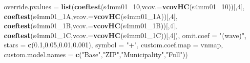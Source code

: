 \documentclass[
]{article}
\newenvironment{Shaded}{\begin{snugshade}}{\end{snugshade}}
\newcommand{\DataTypeTok}[1]{\textcolor[rgb]{0.13,0.29,0.53}{#1}}
\newcommand{\DecValTok}[1]{\textcolor[rgb]{0.00,0.00,0.81}{#1}}
\newcommand{\FloatTok}[1]{\textcolor[rgb]{0.00,0.00,0.81}{#1}}
\newcommand{\KeywordTok}[1]{\textcolor[rgb]{0.13,0.29,0.53}{\textbf{#1}}}
\newcommand{\NormalTok}[1]{#1}
\newcommand{\StringTok}[1]{\textcolor[rgb]{0.31,0.60,0.02}{#1}}
\begin{document}
\begin{Shaded}
\begin{Highlighting}[]
          \DataTypeTok{override.pvalues =} \KeywordTok{list}\NormalTok{(}\KeywordTok{coeftest}\NormalTok{(s4mm01_}\DecValTok{10}\NormalTok{,}\DataTypeTok{vcov.=}\KeywordTok{vcovHC}\NormalTok{(s4mm01_}\DecValTok{10}\NormalTok{))[,}\DecValTok{4}\NormalTok{],}
                                  \KeywordTok{coeftest}\NormalTok{(s4mm01_1A,}\DataTypeTok{vcov.=}\KeywordTok{vcovHC}\NormalTok{(s4mm01_1A))[,}\DecValTok{4}\NormalTok{],}
                                  \KeywordTok{coeftest}\NormalTok{(s4mm01_1B,}\DataTypeTok{vcov.=}\KeywordTok{vcovHC}\NormalTok{(s4mm01_1B))[,}\DecValTok{4}\NormalTok{],}
                                  \KeywordTok{coeftest}\NormalTok{(s4mm01_1C,}\DataTypeTok{vcov.=}\KeywordTok{vcovHC}\NormalTok{(s4mm01_1C))[,}\DecValTok{4}\NormalTok{]),}
          \DataTypeTok{omit.coef =} \StringTok{"(wave)"}\NormalTok{, }\DataTypeTok{stars =} \KeywordTok{c}\NormalTok{(}\FloatTok{0.1}\NormalTok{,}\FloatTok{0.05}\NormalTok{,}\FloatTok{0.01}\NormalTok{,}\FloatTok{0.001}\NormalTok{), }\DataTypeTok{symbol =} \StringTok{"+"}\NormalTok{,}
          \DataTypeTok{custom.coef.map =}\NormalTok{ vnmap, }
          \DataTypeTok{custom.model.names =} \KeywordTok{c}\NormalTok{(}\StringTok{"Base"}\NormalTok{,}\StringTok{"ZIP"}\NormalTok{,}\StringTok{"Municipality"}\NormalTok{,}\StringTok{"Full"}\NormalTok{))}
\end{Highlighting}
\end{Shaded}
\end{document}
